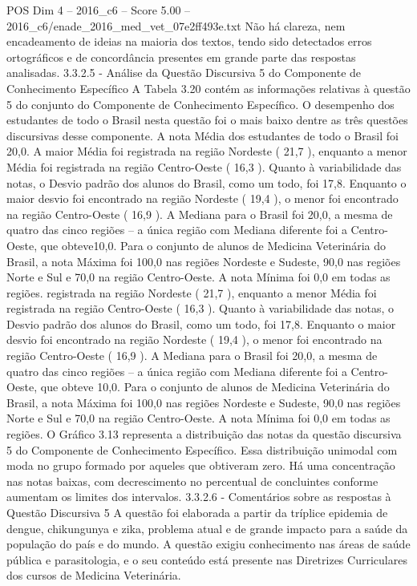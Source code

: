 \begin{textsample}{POS Dim 4 – 2016\_c6 – Score 5.00 – 2016\_c6/enade\_2016\_med\_vet\_07e2ff493e.txt}
Não há clareza, nem encadeamento de ideias na maioria dos textos, tendo sido detectados erros ortográficos e de concordância presentes em grande parte das respostas analisadas. 3.3.2.5 - Análise da Questão Discursiva 5 do Componente de Conhecimento Específico A Tabela 3.20 contém as informações relativas à questão 5 do conjunto do Componente de Conhecimento Específico.
O desempenho dos estudantes de todo o Brasil nesta questão foi o mais baixo dentre as três questões discursivas desse componente.
A nota Média dos estudantes de todo o Brasil foi 20,0.
A maior Média foi registrada na região Nordeste ( 21,7 ), enquanto a menor Média foi registrada na região Centro-Oeste ( 16,3 ).
Quanto à variabilidade das notas, o Desvio padrão dos alunos do Brasil, como um todo, foi 17,8.
Enquanto o maior desvio foi encontrado na região Nordeste ( 19,4 ), o menor foi encontrado na região Centro-Oeste ( 16,9 ).
A Mediana para o Brasil foi 20,0, a mesma de quatro das cinco regiões – a única região com Mediana diferente foi a Centro-Oeste, que obteve10,0.
Para o conjunto de alunos de Medicina Veterinária do Brasil, a nota Máxima foi 100,0 nas regiões Nordeste e Sudeste, 90,0 nas regiões Norte e Sul e 70,0 na região Centro-Oeste.
A nota Mínima foi 0,0 em todas as regiões. registrada na região Nordeste ( 21,7 ), enquanto a menor Média foi registrada na região Centro-Oeste ( 16,3 ).
Quanto à variabilidade das notas, o Desvio padrão dos alunos do Brasil, como um todo, foi 17,8.
Enquanto o maior desvio foi encontrado na região Nordeste ( 19,4 ), o menor foi encontrado na região Centro-Oeste ( 16,9 ).
A Mediana para o Brasil foi 20,0, a mesma de quatro das cinco regiões – a única região com Mediana diferente foi a Centro-Oeste, que obteve 10,0.
Para o conjunto de alunos de Medicina Veterinária do Brasil, a nota Máxima foi 100,0 nas regiões Nordeste e Sudeste, 90,0 nas regiões Norte e Sul e 70,0 na região Centro-Oeste.
A nota Mínima foi 0,0 em todas as regiões.
O Gráfico 3.13 representa a distribuição das notas da questão discursiva 5 do Componente de Conhecimento Específico.
Essa distribuição unimodal com moda no grupo formado por aqueles que obtiveram zero.
Há uma concentração nas notas baixas, com decrescimento no percentual de concluintes conforme aumentam os limites dos intervalos. 3.3.2.6 - Comentários sobre as respostas à Questão Discursiva 5 A questão foi elaborada a partir da tríplice epidemia de dengue, chikungunya e zika, problema atual e de grande impacto para a saúde da população do país e do mundo.
A questão exigiu conhecimento nas áreas de saúde pública e parasitologia, e o seu conteúdo está presente nas Diretrizes Curriculares dos cursos de Medicina Veterinária.

\end{textsample}
